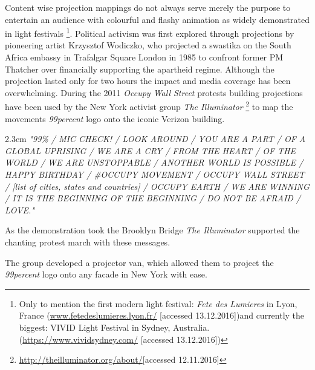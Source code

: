 Content wise projection mappings do not always serve merely the purpose to entertain an audience with colourful and flashy animation as widely demonstrated in light festivals \footnote{Only to mention the first modern light festival: \textit{Fete des Lumieres} in Lyon, France  (\url{www.fetedeslumieres.lyon.fr/} [accessed 13.12.2016])and currently the biggest: VIVID Light Festival in Sydney, Australia.(\url{https://www.vividsydney.com/} [accessed 13.12.2016])}.   
Political activism was first explored through projections by pioneering artist Krzysztof Wodiczko, who projected a swastika on the South Africa embassy in Trafalgar Square London in 1985 to confront former PM Thatcher over financially supporting the  apartheid regime. Although the projection lasted only for two hours the impact and media coverage has been overwhelming.     
During the 2011 \textit{Occupy Wall Street} protests building projections have been used by the New York activist group \textit{The Illuminator}  \footnote{\url{http://theilluminator.org/about/}[accessed 12.11.2016]} to map the movements \textit{99percent}  logo onto the iconic Verizon building. 


\begin{singlespace}
	\leftskip2.3em
		\rightskip\leftskip
\textit{\small "99\% / MIC CHECK! / LOOK AROUND / YOU ARE A PART / OF A GLOBAL UPRISING / WE ARE A CRY / FROM THE HEART / OF THE WORLD / WE ARE UNSTOPPABLE / ANOTHER WORLD IS POSSIBLE / HAPPY BIRTHDAY / \#OCCUPY MOVEMENT / OCCUPY WALL STREET / {[list of cities, states and countries]} / OCCUPY EARTH / WE ARE WINNING / IT IS THE BEGINNING OF THE BEGINNING / DO NOT BE AFRAID / LOVE."} 

\small As the demonstration took the Brooklyn Bridge \textit{The Illuminator} supported the chanting protest march with these messages.
\end{singlespace}


The group developed a projector van, which allowed them to project the \textit{99percent} logo onto any facade in New York with ease.

